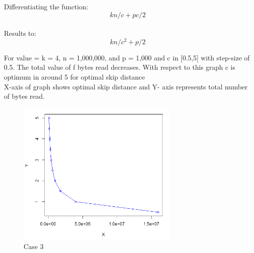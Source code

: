 \documentclass[12pt]{report}
\begin{document}
Differentiating the function: \[kn/c + pc/2\] \\

Results to: \[kn/c^2 + p/2\]

For value =   k = 4, n = 1,000,000, and p = 1,000 and c in [0.5,5] with step-size of 0.5. The total value of  f bytes read decreases.  With respect to this graph c is optimum in around 5 for optimal skip distance\\

X-axis of graph shows optimal skip distance and Y- axis represents   total number of bytes read.
\begin{figure}[ht] 
  \centering
  \includegraphics[width=0.7\textwidth]{Case3_514.PNG}
  \caption{Case 3}
  \label{fig:27}
\end{figure}
\end{document}
